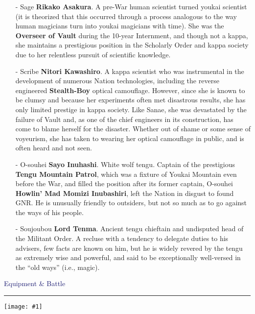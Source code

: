 \documentclass[a4paper,12pt]{book}
\newcommand{\maru}[1]{\raisebox{.5pt}{\textcircled{\raisebox{-.9pt} {#1}}}}
\newcommand{\img}[1]{%
	\texttt{[image: \#1]}%
}
\newcommand{\factionheading}[1]{
\parbox{\textwidth}{
        \vspace{2mm}
        \noindent
        \textcolor{MidnightBlue}{
{\large {#1}
        \vspace*{1mm}
        \hrule}
        \vspace*{3mm}
        \noindent
} } }
\begin{document}
\begin{itemize}
\item[-] Sage \textbf{Rikako Asakura}. A pre-War human scientist turned youkai scientist (it is theorized that this occurred through a process analogous to the way human magicians turn into youkai magicians with time). She was the \textbf{Overseer of Vault \maru{11}} during the 10-year Internment, and though not a kappa, she maintains a prestigious position in the Scholarly Order and kappa society due to her relentless pursuit of scientific knowledge.
\item[-] Scribe \textbf{Nitori Kawashiro}. A kappa scientist who was instrumental in the development of numerous Nation technologies, including the reverse engineered \textbf{Stealth-Boy} optical camouflage. However, since she is known to be clumsy and because her experiments often met disastrous results, she has only limited prestige in kappa society. Like Sanae, she was devastated by the failure of Vault \maru{13} and, as one of the chief engineers in its construction, has come to blame herself for the disaster. Whether out of shame or some sense of voyeurism, she has taken to wearing her optical camouflage in public, and is often heard and not seen.
\item[-] O-souhei \textbf{Sayo Inuhashi}. White wolf tengu. Captain of the prestigious \textbf{Tengu Mountain Patrol}, which was a fixture of Youkai Mountain even before the War, and filled the position after its former captain, O-souhei \textbf{Howlin' Mad Momizi Inubashiri}, left the Nation in disgust to found GNR. He is unusually friendly to outsiders, but not so much as to go against the ways of his people.
\item[-] Soujoubou \textbf{Lord Tenma}. Ancient tengu chieftain and undisputed head of the Militant Order. A recluse with a tendency to delegate duties to his advisers, few facts are known on him, but he is widely revered by the tengu as extremely wise and powerful, and said to be exceptionally well-versed in the ``old ways'' (i.e., magic).
\end{itemize}


\newpage
\factionheading{Equipment \& Battle}

\img{ablative-shield}
\end{document}
